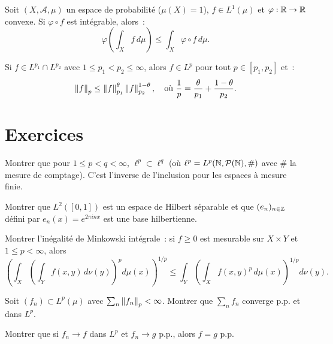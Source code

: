 \begin{proposition}
\label{prop:jensen}
Soit $(X, \mathcal{A}, \mu)$ un espace de probabilit\'e ($\mu(X) = 1$),
$f \in L^1(\mu)$ et $\varphi : \mathbb{R} \to \mathbb{R}$ convexe. Si $\varphi \circ f$ est
int\'egrable, alors~:
\[
\varphi\!\left(\int_X f\, d\mu\right) \leq \int_X \varphi \circ f\, d\mu.
\]
\end{proposition}

\begin{proposition}
Si $f \in L^{p_1} \cap L^{p_2}$ avec $1 \leq p_1 < p_2 \leq \infty$, alors
$f \in L^p$ pour tout $p \in [p_1, p_2]$ et~:
\[
\left\| f \right\|_p \leq \left\| f \right\|_{p_1}^{\theta} \left\| f \right\|_{p_2}^{1-\theta}, \quad
\text{o\`u } \frac{1}{p} = \frac{\theta}{p_1} + \frac{1-\theta}{p_2}.
\]
\end{proposition}

\section{Exercices}

\begin{exercice}
Montrer que pour $1 \leq p < q < \infty$, $\ell^p \subset \ell^q$ (o\`u
$\ell^p = L^p(\mathbb{N}, \mathcal{P}(\mathbb{N}), \#)$ avec $\#$ la mesure de comptage).
C'est l'inverse de l'inclusion pour les espaces \`a mesure finie.
\end{exercice}

\begin{exercice}
Montrer que $L^2([0,1])$ est un espace de Hilbert s\'eparable et que
$(e_n)_{n \in \mathbb{Z}}$ d\'efini par $e_n(x) = e^{2\pi inx}$ est une base hilbertienne.
\end{exercice}

\begin{exercice}
Montrer l'in\'egalit\'e de Minkowski int\'egrale~: si $f \geq 0$ est mesurable sur
$X \times Y$ et $1 \leq p < \infty$, alors
\[
\left(\int_X \left(\int_Y f(x,y)\, d\nu(y)\right)^p d\mu(x)\right)^{1/p}
\leq \int_Y \left(\int_X f(x,y)^p\, d\mu(x)\right)^{1/p} d\nu(y).
\]
\end{exercice}

\begin{exercice}
Soit $(f_n) \subset L^p(\mu)$ avec $\sum_n \left\| f_n \right\|_p < \infty$. Montrer que
$\sum_n f_n$ converge p.p. et dans $L^p$.
\end{exercice}

\begin{exercice}
Montrer que si $f_n \to f$ dans $L^p$ et $f_n \to g$ p.p., alors $f = g$ p.p.
\end{exercice}
